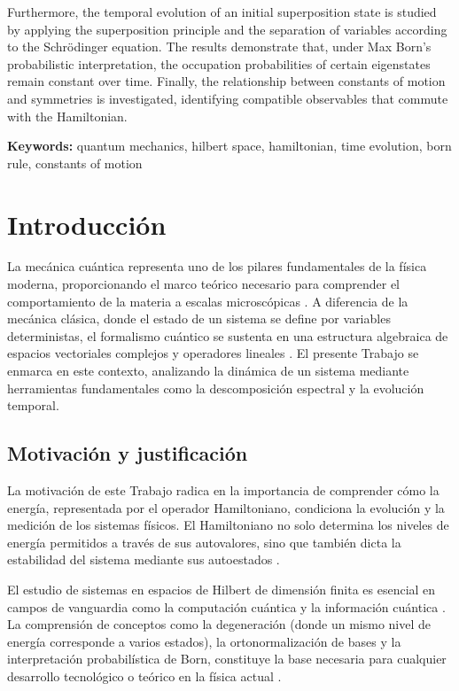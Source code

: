\documentclass[11pt,a4paper,spanish]{book}
\begin{document}
Furthermore, the temporal evolution of an initial superposition state is studied by applying the superposition principle and the separation of variables according to the Schrödinger equation. The results demonstrate that, under Max Born's probabilistic interpretation, the occupation probabilities of certain eigenstates remain constant over time. Finally, the relationship between constants of motion and symmetries is investigated, identifying compatible observables that commute with the Hamiltonian.

\vspace{0.5cm}
{\bf Keywords:} quantum mechanics, hilbert space, hamiltonian, time evolution, born rule, constants of motion

\mainmatter


\chapter{Introducción}

La mecánica cuántica representa uno de los pilares fundamentales de la física moderna, proporcionando el marco teórico necesario para comprender el comportamiento de la materia a escalas microscópicas \citep{planck1900}. A diferencia de la mecánica clásica, donde el estado de un sistema se define por variables deterministas, el formalismo cuántico se sustenta en una estructura algebraica de espacios vectoriales complejos y operadores lineales \citep{dirac1930}. El presente Trabajo se enmarca en este contexto, analizando la dinámica de un sistema mediante herramientas fundamentales como la descomposición espectral y la evolución temporal.

\section{Motivación y justificación}

La motivación de este Trabajo radica en la importancia de comprender cómo la energía, representada por el operador Hamiltoniano, condiciona la evolución y la medición de los sistemas físicos. El Hamiltoniano no solo determina los niveles de energía permitidos a través de sus autovalores, sino que también dicta la estabilidad del sistema mediante sus autoestados \citep{schrodinger1926}. 

El estudio de sistemas en espacios de Hilbert de dimensión finita es esencial en campos de vanguardia como la computación cuántica y la información cuántica \citep{feynman1982}. La comprensión de conceptos como la degeneración (donde un mismo nivel de energía corresponde a varios estados), la ortonormalización de bases y la interpretación probabilística de Born, constituye la base necesaria para cualquier desarrollo tecnológico o teórico en la física actual \citep{born1926}.
\end{document}

